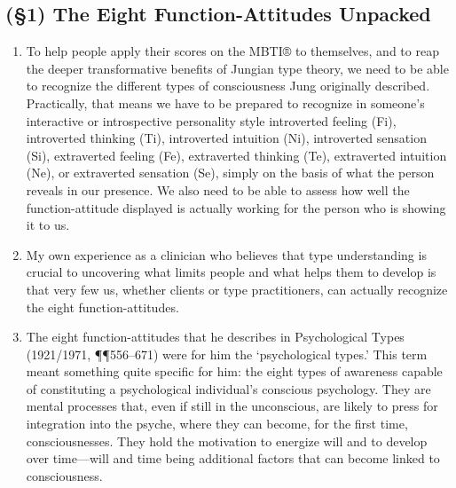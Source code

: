\subsection{(\S1) The Eight Function-Attitudes Unpacked}

\begin{enumerate}

    \item {} To help people apply their
        scores on the MBTI® to themselves, and to reap the deeper
        transformative benefits of Jungian type theory, we need to be able to
        recognize the different types of consciousness Jung originally
        described. Practically, that means we have to be prepared to recognize
        in someone’s interactive or introspective personality style introverted
        feeling (Fi), introverted thinking (Ti), introverted intuition (Ni),
        introverted sensation (Si), extraverted feeling (Fe), extraverted
        thinking (Te), extraverted intuition (Ne), or extraverted sensation
        (Se), simply on the basis of what the person reveals in our presence.
        We also need to be able to assess how well the function-attitude
        displayed is actually working for the person who is showing it to us.

    \item {} My own experience as a
        clinician who believes that type understanding is crucial to uncovering
        what limits people and what helps them to develop is that very few us,
        whether clients or type practitioners, can actually recognize the eight
        function-attitudes.

    \item {} The eight function-attitudes
        that he describes in Psychological Types (1921/1971, ¶¶556–671) were
        for him the ‘psychological types.’ This term meant something quite
        specific for him: the eight types of awareness capable of constituting
        a psychological individual’s conscious psychology. They are mental
        processes that, even if still in the unconscious, are likely to press
        for integration into the psyche, where they can become, for the first
        time, consciousnesses. They hold the motivation to energize will and to
        develop over time—will and time being additional factors that can
        become linked to consciousness.

\end{enumerate}

